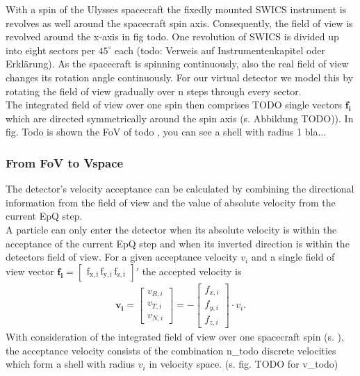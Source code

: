 With a spin of the Ulysses spacecraft the fixedly mounted SWICS instrument is revolves as well around the spacecraft spin axis. Consequently, the field of view is revolved around the x-axis in fig todo. One revolution of SWICS is divided up into eight sectors per $45^\circ$ each (todo: Verweis auf Instrumentenkapitel oder Erklärung). As the spacecraft is spinning continuously, also the real field of view changes its rotation angle continuously.
For our virtual detector we model this by rotating the field of view gradually over n steps through every sector.\\
The integrated field of view over one spin then comprises TODO single vectors $\mathrm{\mathbf{f_i}}$ which are directed symmetrically around the spin axis (s. Abbildung TODO)). In fig. Todo is shown the FoV of todo , you can see a shell with radius 1 bla...
\subsubsection{From FoV to Vspace}
The detector's velocity acceptance can be calculated by combining the directional information from the field of view and the value of absolute velocity from the current EpQ step. 
\\
A particle can only enter the detector when its absolute velocity is within the acceptance of the current EpQ step and when its inverted direction is within the detectors field of view. For a given acceptance velocity $v_i$ and a single field of view vector $\mathrm{\mathbf{f_i} = \begin{bmatrix}f_{x,i}\,f_{y,i}\,f_{z,i}\end{bmatrix}}'$ the accepted velocity is
\begin{align*}
\mathbf{v_i} = \begin{bmatrix}v_{R,i}\\v_{T,i}\\v_{N,i}\end{bmatrix} = - \begin{bmatrix}f_{x,i}\\f_{y,i}\\f_{z,i}\end{bmatrix} \cdot v_i.
\end{align*}
With consideration of the integrated field of view over one spacecraft spin (s. ), the acceptance velocity consists of the combination n\_todo discrete velocities which form a shell with radius $v_i$ in velocity space. (s. fig. TODO for v\_todo)




